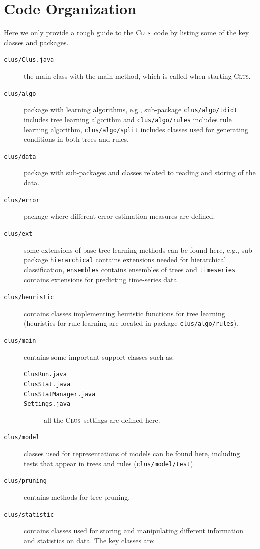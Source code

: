 \documentclass[a4paper]{report}
\newcommand{\clus}{\textsc{Clus}}
\begin{document}
\section{Code Organization}
Here we only provide a rough guide to the \clus\ code by listing some of the key classes and packages.
\begin{description}
	\item[\texttt{clus/Clus.java}] the main class with the main method, which is called when starting \clus.
	\item[\texttt{clus/algo}] package with learning algorithms, e.g., sub-package \texttt{clus/algo/tdidt} includes tree learning algorithm and \texttt{clus/algo/rules} includes rule learning algorithm, \texttt{clus/algo/split} includes classes used for generating conditions in both trees and rules.
	\item[\texttt{clus/data}] package with sub-packages and classes related to reading and storing of the data.
	\item[\texttt{clus/error}] package where different error estimation measures are defined.
	\item[\texttt{clus/ext}] some extensions of base tree learning methods can be found here, e.g., sub-package \texttt{hierarchical} contains extensions needed for hierarchical classification, \texttt{ensembles} contains ensembles of trees and \texttt{timeseries} contains extensions for predicting time-series data.
	\item[\texttt{clus/heuristic}] contains classes implementing heuristic functions for tree learning (heuristics for rule learning are located in package \texttt{clus/algo/rules}).
	\item[\texttt{clus/main}] contains some important support classes such as:
	\begin{description}
		\item[\texttt{ClusRun.java}]
		\item[\texttt{ClusStat.java}]
		\item[\texttt{ClusStatManager.java}]
		\item[\texttt{Settings.java}] all the \clus\ settings are defined here.
	\end{description}
	\item[\texttt{clus/model}] classes used for representations of models can be found here, including tests that appear in trees and rules (\texttt{clus/model/test}).
	\item[\texttt{clus/pruning}] contains methods for tree pruning.
	\item[\texttt{clus/statistic}] contains classes used for storing and manipulating different information and statistics on data. The key classes are:

\end{description}
\end{document}
